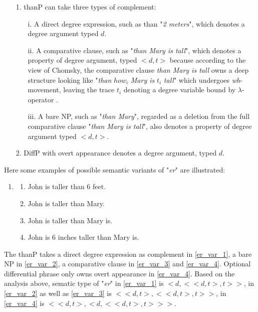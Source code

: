 \documentclass{ctexart}
\let \cite \parencite
\begin{document}
\begin{itemize}
\item[1.]
thanP can take three types of complement:

\begin{itemize}
\item[i.]
A direct degree expression, such as than "\textit{2 meters}", which denotes a degree argument typed $d$.
\item[ii.]
A comparative clause, such as "\textit{than Mary is tall}", which denotes a property of degree argument, typed $<d,t>$ because according to the view of Chomsky, the comparative clause \textit{than Mary is tall} owns a deep structure looking like "\textit{than} $how_i$ \textit{Mary is} $t_i$ \textit{tall}" which undergoes \textit{wh}-movement, leaving the trace $t_i$ denoting a degree variable bound by $\lambda$-operator \cite{chomsky1977}.
\item[iii.]
A bare NP, such as "\textit{than Mary}", regarded as a deletion from the full comparative clause "\textit{than Mary is tall}", also denotes a property of degree argument typed $<d,t>$.
\end{itemize}

\item[2.]
DiffP with overt appearance denotes a degree argument, typed $d$.

\end{itemize}

Here some examples of possible semantic variants of "\textit{er}" are illustrated:

\begin{enumerate}
    \item
    \begin{enumerate}
        \item \label{er_var_1} John is taller than 6 feet.
        \item \label{er_var_2} John is taller than Mary.
        \item \label{er_var_3} John is taller than Mary is.
        \item \label{er_var_4} John is 6 inches taller than Mary is.
    \end{enumerate}

\end{enumerate}

\noindent
The thanP takes a direct degree expression as complement in \ref{er_var_1}, a bare NP in \ref{er_var_2}, a comparative clause in \ref{er_var_3} and \ref{er_var_4}. Optional differential phrase only owns overt appearance in \ref{er_var_4}. Based on the analysis above, sematic type of "\textit{er}" in \ref{er_var_1} is $<d,<<d,t>,t>>$, in \ref{er_var_2} as well as \ref{er_var_3} is $<<d,t>,<<d,t>,t>>$, in \ref{er_var_4} is $<<d,t>,<d,<<d,t>,t>>>$.
\end{document}
